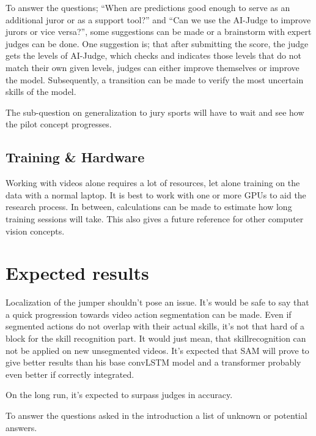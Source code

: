 
To answer the questions; ``When are predictions good enough to serve as an additional juror or as a support tool?'' and ``Can we use the AI-Judge to improve jurors or vice versa?'', some suggestions can be made or a brainstorm with expert judges can be done. One suggestion is; that after submitting the score, the judge gets the levels of AI-Judge, which checks and indicates those levels that do not match their own given levels, judges can either improve themselves or improve the model. Subsequently, a transition can be made to verify the most uncertain skills of the model.

The sub-question on generalization to jury sports will have to wait and see how the pilot concept progresses.

\subsection{Training \& Hardware}

Working with videos alone requires a lot of resources, let alone training on the data with a normal laptop. It is best to work with one or more GPUs to aid the research process. In between, calculations can be made to estimate how long training sessions will take. This also gives a future reference for other computer vision concepts.


\section{Expected results}
\label{sec:verwachte-resultaten}

Localization of the jumper shouldn't pose an issue. It's would be safe to say that a quick progression towards video action segmentation can be made. Even if segmented actions do not overlap with their actual skills, it's not that hard of a block for the skill recognition part. It would just mean, that skillrecognition can not be applied on new unsegmented videos.
It's expected that SAM will prove to give better results than his base convLSTM model and a transformer probably even better if correctly integrated.

On the long run, it's expected to surpass judges in accuracy.

To answer the questions asked in the introduction a list of unknown or potential answers.

